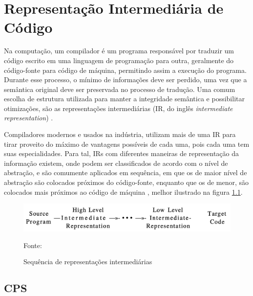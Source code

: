 \chapter{Representação Intermediária de Código}\label{ch:IR}

Na computação, um compilador é um programa responsável por traduzir um código escrito em uma linguagem de programação para outra, geralmente do código-fonte para código de máquina, permitindo assim a execução do programa.
Durante esse processo, o mínimo de informações deve ser perdido, uma vez que a semântica original deve ser preservada no processo de tradução.
Uma comum escolha de estrutura utilizada para manter a integridade semântica e possibilitar otimizações, são as representações intermediárias (IR, do inglês \textit{intermediate representation}) \cite{cooper2014}.

Compiladores modernos e usados na indústria, utilizam mais de uma IR para tirar proveito do máximo de vantagens possíveis de cada uma, pois cada uma tem suas especialidades.
Para tal, IRs com diferentes maneiras de representação da informação existem, onde podem ser classificados de acordo com o nível de abstração, e são comumente aplicados em sequência, em que os de maior nível de abstração são colocados próximos do código-fonte, enquanto que os de menor, são colocados mais próximos ao código de máquina \cite{aho2008compilers}, melhor ilustrado na figura \ref{fig:abstraction-level-irs}.

\begin{figure}
  \centering
  \includegraphics[width=.7\textwidth]{Imagens/abstraction-level-irs.png}
  \caption{Sequência de representações intermediárias}
  \label{fig:abstraction-level-irs}
  \small{Fonte: \cite{aho2008compilers}}
\end{figure}



\section{CPS}\label{sec:cps}









